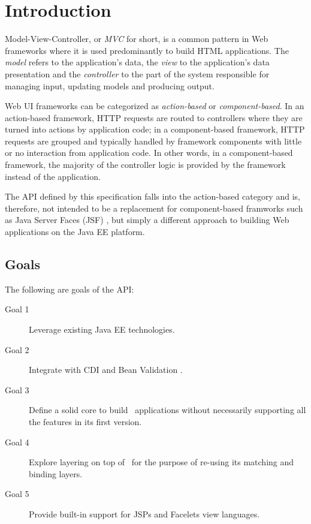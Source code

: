 \chapter{Introduction}

Model-View-Controller, or {\em MVC} for short, is a common pattern in Web frameworks 
where it is used predominantly to build HTML applications. The {\em model} refers to the 
application's data, the {\em view} to the application's data presentation and the 
{\em controller} to the part of the system responsible for managing input, updating models 
and producing output.

Web UI frameworks can be categorized as {\em action-based} or {\em component-based}. In an action-based 
framework, HTTP requests are routed to controllers where they are turned into actions by application code; 
in a component-based framework, HTTP requests are grouped and typically handled by framework components
with little or no interaction from application code. In other words, in a component-based framework,
the majority of the controller logic is provided by the framework instead of the application.

The API defined by this specification falls into the action-based 
category and is, therefore, not intended to be a replacement for component-based framworks such as
Java Server Faces (JSF) \cite{jsf}, but simply a different approach to building Web applications on the 
Java EE platform.

\section{Goals}
\label{goals}

The following are goals of the API:

\begin{description}
\item[Goal 1] Leverage existing Java EE technologies. 
\item[Goal 2] Integrate with CDI \cite{cdi} and Bean Validation \cite{bv11}.
\item[Goal 3] Define a solid core to build \mvc\ applications without necessarily supporting all the 
features in its first version.
\item[Goal 4] Explore layering on top of \jaxrs\ for the purpose of re-using its
matching and binding layers.
\item[Goal 5] Provide built-in support for JSPs and Facelets view languages.
\end{description}

